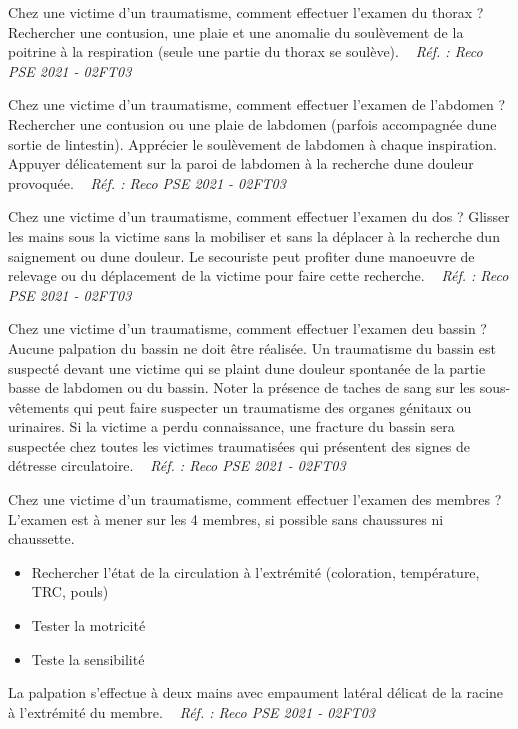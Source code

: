 \documentclass[grid,avery5371,landscape]{flashcards}
\makeatletter
\newcounter{nocarte}
\newcommand{\categ}[1]{%
  \def\@categ{#1}%
  \setcounter{nocarte}{0}%
}
\newcommand{\source}[1]{%
  \medskip
  \itshape%
   ~ \hfill Réf. : #1}
\makeatother
\begin{document}
\color[HTML]{003273}
\categ{PSE}
\begin{flashcard}[geste]{
 Chez une victime d'un traumatisme, comment effectuer l'examen du thorax ?   }
  Rechercher une contusion, une plaie et une anomalie du soulèvement de la poitrine à la respiration (seule une partie du thorax se soulève).
  \source{Reco PSE 2021 - 02FT03}
\end{flashcard}


\color[HTML]{003273}
\categ{PSE}
\begin{flashcard}[geste]{
 Chez une victime d'un traumatisme, comment effectuer l'examen de l'abdomen ?   }
  Rechercher une contusion ou une plaie de labdomen (parfois accompagnée dune sortie de lintestin). Apprécier le soulèvement de labdomen à chaque inspiration. Appuyer délicatement sur la paroi de labdomen à la recherche dune douleur provoquée.
  \source{Reco PSE 2021 - 02FT03}
\end{flashcard}


\color[HTML]{003273}
\categ{PSE}
\begin{flashcard}[geste]{
 Chez une victime d'un traumatisme, comment effectuer l'examen du dos ?   }
  Glisser les mains sous la victime sans la mobiliser et sans la déplacer à la recherche dun saignement ou dune douleur. Le secouriste peut profiter dune manoeuvre de relevage ou du déplacement de la victime pour faire cette recherche.
  \source{Reco PSE 2021 - 02FT03}
\end{flashcard}


\color[HTML]{003273}
\categ{PSE}
\begin{flashcard}[geste]{
 Chez une victime d'un traumatisme, comment effectuer l'examen deu bassin ?   }
  Aucune palpation du bassin ne doit être réalisée. Un traumatisme du bassin est suspecté devant une
victime qui se plaint dune douleur spontanée de la partie basse de labdomen ou du bassin. Noter la
présence de taches de sang sur les sous-vêtements qui peut faire suspecter un traumatisme des
organes génitaux ou urinaires.
Si la victime a perdu connaissance, une fracture du bassin sera suspectée chez toutes les victimes
traumatisées qui présentent des signes de détresse circulatoire.
  \source{Reco PSE 2021 - 02FT03}
\end{flashcard}


\color[HTML]{003273}
\categ{PSE}
\begin{flashcard}[geste]{
 Chez une victime d'un traumatisme, comment effectuer l'examen des membres  ?   }
  L'examen est à mener sur les 4 membres, si possible sans chaussures ni chaussette. \\
\begin{itemize}
\item Rechercher l'état de la circulation à l'extrémité (coloration, température, TRC, pouls)
\item Tester la motricité 
\item Teste la sensibilité
\end{itemize}
La palpation s'effectue à deux mains avec empaument latéral délicat de la racine à l'extrémité du membre.
  \source{Reco PSE 2021 - 02FT03}
\end{flashcard}
\end{document}

